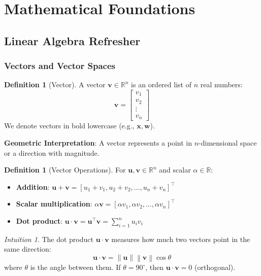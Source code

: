 \documentclass[11pt,twoside]{article}
\numberwithin{equation}{section}
\newcommand{\R}{\mathbb{R}}
\newcommand{\vect}[1]{\bm{#1}}
\newcommand{\norm}[1]{\left\lVert#1\right\rVert}
\theoremstyle{plain}
\theoremstyle{definition}
\newtheorem{definition}[theorem]{Definition}
\theoremstyle{remark}
\newtheorem{intuition}[theorem]{Intuition}
\begin{document}
\section{Mathematical Foundations}
\label{sec:math-foundations}

\subsection{Linear Algebra Refresher}

\subsubsection{Vectors and Vector Spaces}

\begin{definition}[Vector]
A vector $\vect{v} \in \R^n$ is an ordered list of $n$ real numbers:
\[
\vect{v} = \begin{bmatrix} v_1 \\ v_2 \\ \vdots \\ v_n \end{bmatrix}
\]
We denote vectors in bold lowercase (e.g., $\vect{x}, \vect{w}$).
\end{definition}

\textbf{Geometric Interpretation}: A vector represents a point in $n$-dimensional space or a direction with magnitude.

\begin{definition}[Vector Operations]
For $\vect{u}, \vect{v} \in \R^n$ and scalar $\alpha \in \R$:
\begin{itemize}
\item \textbf{Addition}: $\vect{u} + \vect{v} = [u_1+v_1, u_2+v_2, \ldots, u_n+v_n]^\top$
\item \textbf{Scalar multiplication}: $\alpha \vect{v} = [\alpha v_1, \alpha v_2, \ldots, \alpha v_n]^\top$
\item \textbf{Dot product}: $\vect{u} \cdot \vect{v} = \vect{u}^\top \vect{v} = \sum_{i=1}^n u_i v_i$
\end{itemize}
\end{definition}

\begin{intuition}
The dot product $\vect{u} \cdot \vect{v}$ measures how much two vectors point in the same direction:
\[
\vect{u} \cdot \vect{v} = \norm{\vect{u}} \norm{\vect{v}} \cos\theta
\]
where $\theta$ is the angle between them. If $\theta = 90^{\circ}$, then $\vect{u} \cdot \vect{v} = 0$ (orthogonal).
\end{intuition}
\end{document}
